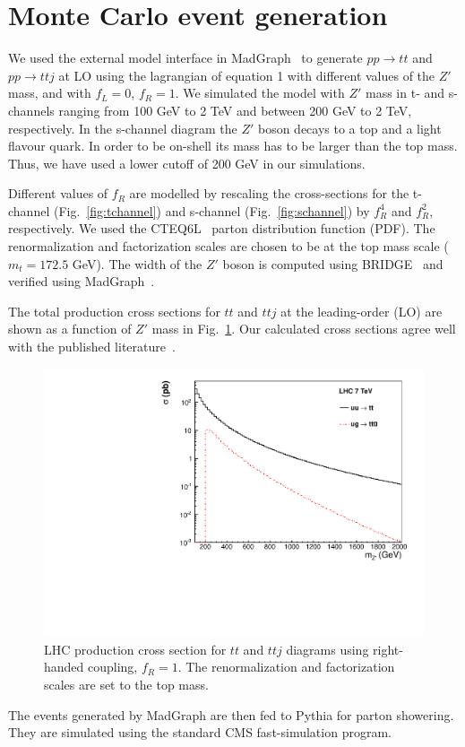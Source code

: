 \section{Monte Carlo event generation}
\label{sec:mc}


We used the external model interface in MadGraph~\cite{madgraph} 
to generate $pp \to tt$ and $pp \to ttj$ at LO 
using the lagrangian of equation 1 with
different values of 
the $Z'$ mass, and with $f_L = 0$, $f_R = 1$.  We simulated the model
with $Z'$ mass in t- and s-channels ranging from 100 GeV to 2 TeV  and 
between 200 GeV to 2 TeV, respectively. In the s-channel diagram the $Z'$ boson
decays to a top and a light flavour quark. In order to be on-shell
its mass has to be larger than the top mass. Thus, we have used a lower
cutoff of 200 GeV in our simulations.


Different
values of $f_R$ are modelled by rescaling the cross-sections
for the t-channel (Fig.~\ref{fig:tchannel}) and 
s-channel (Fig.~\ref{fig:schannel}) by $f_R^4$ and $f_R^2$,
respectively.  We used the 
CTEQ6L~\cite{cteq6l} parton distribution function (PDF). 
The renormalization and factorization scales are chosen 
to be at the top mass scale ($m_{t} = 172.5$ GeV). 
The width of the $Z'$ boson is computed using 
BRIDGE~\cite{bridge} and verified using MadGraph~\cite{madgraph}. 

The total production cross sections for $tt$ and $ttj$ 
at the leading-order (LO) are shown as a function of $Z'$ 
mass in 
Fig.~\ref{fig:sstopcross}. 
Our calculated cross sections agree well with the 
published literature~\cite{berger}. 

\begin{figure}[htb]
\begin{center}
\includegraphics[width=0.7\linewidth]{figs/sstopcross.pdf}
\caption{ LHC production cross section for $tt$ and $ttj$ diagrams using right-handed coupling, $f_R = 1$. 
The renormalization and factorization scales are set to the top mass. \label{fig:sstopcross}}
\end{center}
\end{figure}

The events generated by MadGraph are then fed to Pythia for 
parton showering.  They are simulated using the standard CMS
fast-simulation program.



